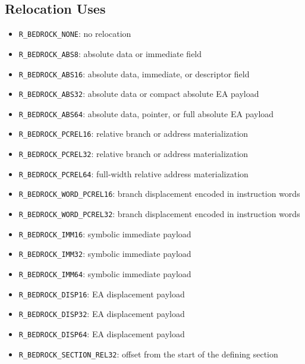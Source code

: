 \documentclass[10pt,twoside]{article}
\begin{document}
\subsection{Relocation Uses}
\begin{itemize}
\item \texttt{R\_\allowbreak{}BEDROCK\_\allowbreak{}NONE}: no relocation
\item \texttt{R\_\allowbreak{}BEDROCK\_\allowbreak{}ABS8}: absolute data or immediate field
\item \texttt{R\_\allowbreak{}BEDROCK\_\allowbreak{}ABS16}: absolute data, immediate, or descriptor field
\item \texttt{R\_\allowbreak{}BEDROCK\_\allowbreak{}ABS32}: absolute data or compact absolute EA payload
\item \texttt{R\_\allowbreak{}BEDROCK\_\allowbreak{}ABS64}: absolute data, pointer, or full absolute EA payload
\item \texttt{R\_\allowbreak{}BEDROCK\_\allowbreak{}PCREL16}: relative branch or address materialization
\item \texttt{R\_\allowbreak{}BEDROCK\_\allowbreak{}PCREL32}: relative branch or address materialization
\item \texttt{R\_\allowbreak{}BEDROCK\_\allowbreak{}PCREL64}: full-width relative address materialization
\item \texttt{R\_\allowbreak{}BEDROCK\_\allowbreak{}WORD\_\allowbreak{}PCREL16}: branch displacement encoded in instruction words
\item \texttt{R\_\allowbreak{}BEDROCK\_\allowbreak{}WORD\_\allowbreak{}PCREL32}: branch displacement encoded in instruction words
\item \texttt{R\_\allowbreak{}BEDROCK\_\allowbreak{}IMM16}: symbolic immediate payload
\item \texttt{R\_\allowbreak{}BEDROCK\_\allowbreak{}IMM32}: symbolic immediate payload
\item \texttt{R\_\allowbreak{}BEDROCK\_\allowbreak{}IMM64}: symbolic immediate payload
\item \texttt{R\_\allowbreak{}BEDROCK\_\allowbreak{}DISP16}: EA displacement payload
\item \texttt{R\_\allowbreak{}BEDROCK\_\allowbreak{}DISP32}: EA displacement payload
\item \texttt{R\_\allowbreak{}BEDROCK\_\allowbreak{}DISP64}: EA displacement payload
\item \texttt{R\_\allowbreak{}BEDROCK\_\allowbreak{}SECTION\_\allowbreak{}REL32}: offset from the start of the defining section

\end{itemize}
\end{document}
